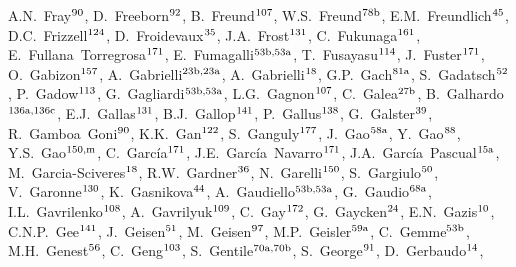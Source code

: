 \begin{flushleft}
A.N.~Fray$^\textrm{\scriptsize 90}$,    
D.~Freeborn$^\textrm{\scriptsize 92}$,    
B.~Freund$^\textrm{\scriptsize 107}$,    
W.S.~Freund$^\textrm{\scriptsize 78b}$,    
E.M.~Freundlich$^\textrm{\scriptsize 45}$,    
D.C.~Frizzell$^\textrm{\scriptsize 124}$,    
D.~Froidevaux$^\textrm{\scriptsize 35}$,    
J.A.~Frost$^\textrm{\scriptsize 131}$,    
C.~Fukunaga$^\textrm{\scriptsize 161}$,    
E.~Fullana~Torregrosa$^\textrm{\scriptsize 171}$,    
E.~Fumagalli$^\textrm{\scriptsize 53b,53a}$,    
T.~Fusayasu$^\textrm{\scriptsize 114}$,    
J.~Fuster$^\textrm{\scriptsize 171}$,    
O.~Gabizon$^\textrm{\scriptsize 157}$,    
A.~Gabrielli$^\textrm{\scriptsize 23b,23a}$,    
A.~Gabrielli$^\textrm{\scriptsize 18}$,    
G.P.~Gach$^\textrm{\scriptsize 81a}$,    
S.~Gadatsch$^\textrm{\scriptsize 52}$,    
P.~Gadow$^\textrm{\scriptsize 113}$,    
G.~Gagliardi$^\textrm{\scriptsize 53b,53a}$,    
L.G.~Gagnon$^\textrm{\scriptsize 107}$,    
C.~Galea$^\textrm{\scriptsize 27b}$,    
B.~Galhardo$^\textrm{\scriptsize 136a,136c}$,    
E.J.~Gallas$^\textrm{\scriptsize 131}$,    
B.J.~Gallop$^\textrm{\scriptsize 141}$,    
P.~Gallus$^\textrm{\scriptsize 138}$,    
G.~Galster$^\textrm{\scriptsize 39}$,    
R.~Gamboa~Goni$^\textrm{\scriptsize 90}$,    
K.K.~Gan$^\textrm{\scriptsize 122}$,    
S.~Ganguly$^\textrm{\scriptsize 177}$,    
J.~Gao$^\textrm{\scriptsize 58a}$,    
Y.~Gao$^\textrm{\scriptsize 88}$,    
Y.S.~Gao$^\textrm{\scriptsize 150,m}$,    
C.~Garc\'ia$^\textrm{\scriptsize 171}$,    
J.E.~Garc\'ia~Navarro$^\textrm{\scriptsize 171}$,    
J.A.~Garc\'ia~Pascual$^\textrm{\scriptsize 15a}$,    
M.~Garcia-Sciveres$^\textrm{\scriptsize 18}$,    
R.W.~Gardner$^\textrm{\scriptsize 36}$,    
N.~Garelli$^\textrm{\scriptsize 150}$,    
S.~Gargiulo$^\textrm{\scriptsize 50}$,    
V.~Garonne$^\textrm{\scriptsize 130}$,    
K.~Gasnikova$^\textrm{\scriptsize 44}$,    
A.~Gaudiello$^\textrm{\scriptsize 53b,53a}$,    
G.~Gaudio$^\textrm{\scriptsize 68a}$,    
I.L.~Gavrilenko$^\textrm{\scriptsize 108}$,    
A.~Gavrilyuk$^\textrm{\scriptsize 109}$,    
C.~Gay$^\textrm{\scriptsize 172}$,    
G.~Gaycken$^\textrm{\scriptsize 24}$,    
E.N.~Gazis$^\textrm{\scriptsize 10}$,    
C.N.P.~Gee$^\textrm{\scriptsize 141}$,    
J.~Geisen$^\textrm{\scriptsize 51}$,    
M.~Geisen$^\textrm{\scriptsize 97}$,    
M.P.~Geisler$^\textrm{\scriptsize 59a}$,    
C.~Gemme$^\textrm{\scriptsize 53b}$,    
M.H.~Genest$^\textrm{\scriptsize 56}$,    
C.~Geng$^\textrm{\scriptsize 103}$,    
S.~Gentile$^\textrm{\scriptsize 70a,70b}$,    
S.~George$^\textrm{\scriptsize 91}$,    
D.~Gerbaudo$^\textrm{\scriptsize 14}$,    

\end{flushleft}
